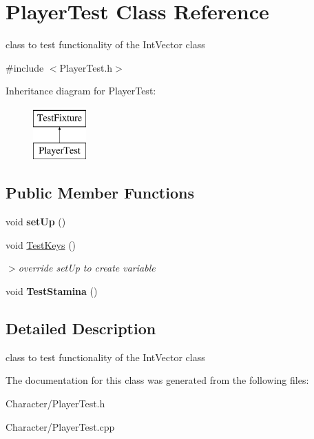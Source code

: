 \hypertarget{classPlayerTest}{\section{Player\-Test Class Reference}
\label{classPlayerTest}
}


class to test functionality of the Int\-Vector class  




{\ttfamily \#include $<$Player\-Test.\-h$>$}

Inheritance diagram for Player\-Test\-:\begin{figure}[H]
\begin{center}
\leavevmode
\includegraphics[height=2.000000cm]{classPlayerTest}
\end{center}
\end{figure}
\subsection*{Public Member Functions}
\begin{DoxyCompactItemize}
\item 
\hypertarget{classPlayerTest_a5fc4e3940fe2442cc760b12985ceef3b}{void {\bfseries set\-Up} ()}\label{classPlayerTest_a5fc4e3940fe2442cc760b12985ceef3b}

\item 
\hypertarget{classPlayerTest_af7b63b181271a7fa168cf73b0d85d346}{void \hyperlink{classPlayerTest_af7b63b181271a7fa168cf73b0d85d346}{Test\-Keys} ()}\label{classPlayerTest_af7b63b181271a7fa168cf73b0d85d346}

\begin{DoxyCompactList}\small\item\em $>$override {\ttfamily set\-Up} to create variable \end{DoxyCompactList}\item 
\hypertarget{classPlayerTest_af409ece08e5ae96a32d72377c9469807}{void {\bfseries Test\-Stamina} ()}\label{classPlayerTest_af409ece08e5ae96a32d72377c9469807}

\end{DoxyCompactItemize}


\subsection{Detailed Description}
class to test functionality of the Int\-Vector class 

The documentation for this class was generated from the following files\-:\begin{DoxyCompactItemize}
\item 
Character/Player\-Test.\-h\item 
Character/Player\-Test.\-cpp\end{DoxyCompactItemize}
